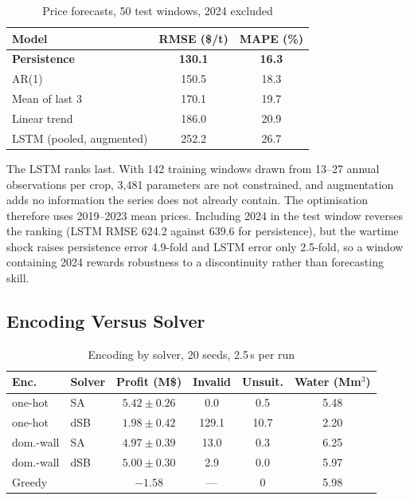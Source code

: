 \documentclass[conference,a4paper]{IEEEtran}
\begin{document}
\begin{table}[t]
\centering
\caption{Price forecasts, 50 test windows, 2024 excluded}
\label{tab:lstm}
\footnotesize
\begin{tabular}{lcc}
\toprule
Model & RMSE (\$/t) & MAPE (\%) \\
\midrule
\textbf{Persistence} & \textbf{130.1} & \textbf{16.3} \\
AR(1) & 150.5 & 18.3 \\
Mean of last 3 & 170.1 & 19.7 \\
Linear trend & 186.0 & 20.9 \\
LSTM (pooled, augmented) & 252.2 & 26.7 \\
\bottomrule
\end{tabular}
\end{table}

The LSTM ranks last. With 142 training windows drawn from 13--27 annual
observations per crop, 3{,}481 parameters are not constrained, and
augmentation adds no information the series does not already contain. The
optimisation therefore uses 2019--2023 mean prices. Including 2024 in the test
window reverses the ranking (LSTM RMSE 624.2 against 639.6 for persistence),
but the wartime shock raises persistence error 4.9-fold and LSTM error only
2.5-fold, so a window containing 2024 rewards robustness to a discontinuity
rather than forecasting skill.

\subsection{Encoding Versus Solver}

\begin{table}[t]
\centering
\caption{Encoding by solver, 20 seeds, 2.5\,s per run}
\label{tab:bench}
\footnotesize
\setlength{\tabcolsep}{4pt}
\begin{tabular}{llcccc}
\toprule
Enc. & Solver & Profit (M\$) & Invalid & Unsuit. & Water (Mm$^3$) \\
\midrule
one-hot & SA  & $5.42\pm0.26$ & 0.0   & 0.5  & 5.48 \\
one-hot & dSB & $1.98\pm0.42$ & 129.1 & 10.7 & 2.20 \\
dom.-wall & SA  & $4.97\pm0.39$ & 13.0 & 0.3 & 6.25 \\
dom.-wall & dSB & $5.00\pm0.30$ & 2.9  & 0.0 & 5.97 \\
\midrule
\multicolumn{2}{l}{Greedy} & $-1.58$ & --- & 0 & 5.98 \\
\bottomrule
\end{tabular}
\end{table}
\end{document}
